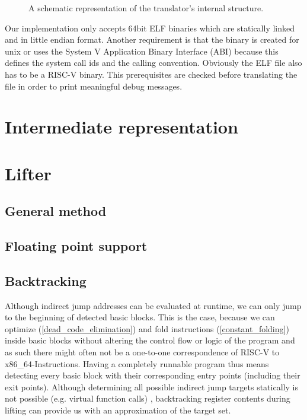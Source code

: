 \documentclass[course=eragp]{aspdoc}
\begin{document}
\begin{figure}
    \centering
    \caption{
        A schematic representation of the translator's internal structure.
    }
    \label{program_overview}
\end{figure}

\par

Our implementation only accepts 64bit ELF binaries which are statically linked and in little endian
format. Another requirement is that the binary is created for unix or uses the System V Application
Binary Interface (ABI) because this defines the system call ids and the calling convention.
Obviously the ELF file also has to be a RISC-V binary. This prerequisites are checked before
translating the file in order to print meaningful debug messages.


\section{Intermediate representation}

\section{Lifter}
\subsection{General method}
\subsection{Floating point support}
\subsection{Backtracking}\label{backtracking}
Although indirect jump addresses can be evaluated at runtime, we can only jump to the beginning of
detected basic blocks. This is the case, because we can optimize (\ref{dead_code_elimination}) and fold
instructions (\ref{constant_folding}) inside basic blocks without altering the control flow or
logic of the program and as such there might often not be a one-to-one correspondence of RISC-V to x86\_64-Instructions.
Having a completely runnable program thus means detecting every basic block
with their corresponding entry points (including their exit points). Although determining all possible 
indirect jump targets statically is not possible (e.g. virtual function calls)
, backtracking register contents during lifting can provide us with 
an approximation of the target set.
\end{document}
